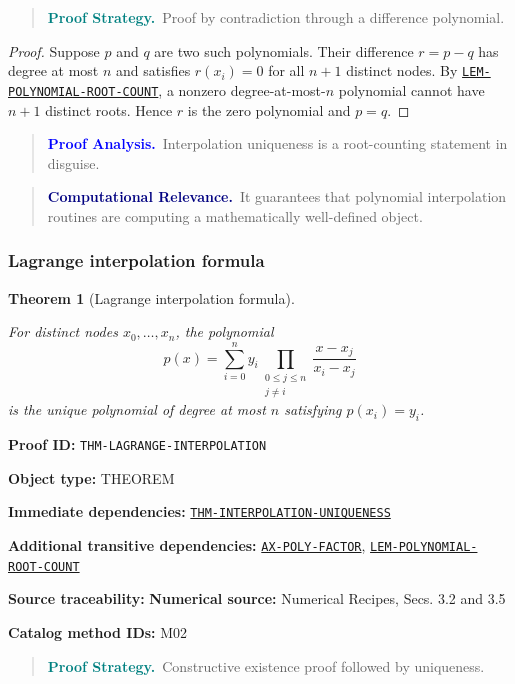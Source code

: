 \documentclass[10pt]{article}
\newcommand{\pidraw}[1]{\begingroup\urlstyle{tt}\nolinkurl{#1}\endgroup}
\newcommand{\pidref}[1]{\hyperref[prf:#1]{\pidraw{#1}}}
\newcommand{\pid}[1]{\pidref{#1}}
\newtheorem{theorem}{Theorem}[section]
\theoremstyle{definition}
\theoremstyle{remark}
\newenvironment{proofstrategy}
{\begin{quote}\small\noindent\textbf{\textcolor{teal}{Proof Strategy.}}\ }
{\end{quote}}
\newenvironment{proofanalysis}
{\begin{quote}\small\noindent\textbf{\textcolor{blue}{Proof Analysis.}}\ }
{\end{quote}}
\newenvironment{computationalrelevance}
{\begin{quote}\small\noindent\textbf{\textcolor{navy}{Computational Relevance.}}\ }
{\end{quote}}
\newcommand{\meta}[2]{\noindent\textbf{#1:} #2\par}
\begin{document}
\begin{proofstrategy}Proof by contradiction through a difference polynomial.\end{proofstrategy}

\begin{proof}

Suppose $p$ and $q$ are two such polynomials. Their difference
$r=p-q$ has degree at most $n$ and satisfies
$r(x_i)=0$ for all $n+1$ distinct nodes. By
\pid{LEM-POLYNOMIAL-ROOT-COUNT}, a nonzero degree-at-most-$n$ polynomial cannot
have $n+1$ distinct roots. Hence $r$ is the zero polynomial and $p=q$.

\end{proof}

\begin{proofanalysis}Interpolation uniqueness is a root-counting statement in disguise.\end{proofanalysis}

\begin{computationalrelevance}It guarantees that polynomial interpolation routines are computing a mathematically well-defined object.\end{computationalrelevance}

\subsubsection{Lagrange interpolation formula}

\begin{theorem}[Lagrange interpolation formula]\label{prf:THM-LAGRANGE-INTERPOLATION}

For distinct nodes $x_0,\ldots,x_n$, the polynomial
\[
p(x)=\sum_{i=0}^n y_i
\prod_{\substack{0\le j\le n\\j\ne i}}
\frac{x-x_j}{x_i-x_j}
\]
is the unique polynomial of degree at most $n$ satisfying $p(x_i)=y_i$.

\end{theorem}

\meta{Proof ID}{\pidraw{THM-LAGRANGE-INTERPOLATION}}
\meta{Object type}{THEOREM}
\meta{Immediate dependencies}{\pidref{THM-INTERPOLATION-UNIQUENESS}}
\meta{Additional transitive dependencies}{\pidref{AX-POLY-FACTOR}, \pidref{LEM-POLYNOMIAL-ROOT-COUNT}}
\meta{Source traceability}{\textbf{Numerical source:} Numerical Recipes, Secs. 3.2 and 3.5}
\meta{Catalog method IDs}{M02}

\begin{proofstrategy}Constructive existence proof followed by uniqueness.\end{proofstrategy}
\end{document}
